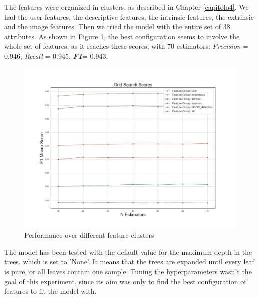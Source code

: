 The features were organized in clusters, as described in Chapter \ref{capitolo4}.
We had the user features, the descriptive features, the intrinsic features, the extrinsic and the image features. Then we tried the model with the entire set of 38 attributes.
As shown in Figure \ref{fig:feature_clusters}, the best configuration seems to involve the whole set of features, as it reaches these scores, with 70 estimators: \textit{Precision} = 0.946, \textit{Recall} = 0.945, \textbf{\textit{F1}}= 0.943.
\begin{figure}[htp!]
	\centering
	\includegraphics[width=\columnwidth]{chapter5/figure/feature_cluster_f1.png}
	\caption{Performance over different feature clusters}
	\label{fig:feature_clusters}
\end{figure}

The model has been tested with the default value for the maximum depth in the trees, which is set to 'None'. It means that the trees are expanded until every leaf is pure, or all leaves contain one sample.
Tuning the hyperparameters wasn't the goal of this experiment, since its aim was only to find the best configuration of features to fit the model with.

